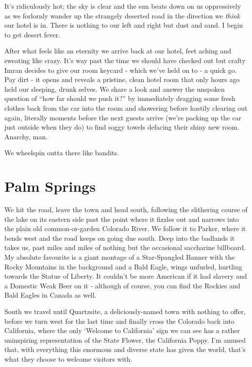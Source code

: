 \documentclass[a5paper,titlepage,11pt]{book}
\begin{document}
It's ridiculously hot; the sky is clear and the sun beats down on us oppressively as we forlornly wander up the strangely deserted road in the direction we \emph{think} our hotel is in.  There is nothing to our left and right but dust and sand.  I begin to get desert fever.

After what feels like an eternity we arrive back at our hotel, feet aching and sweating like crazy.  It's way past the time we should have checked out but crafty Imran decides to give our room keycard - which we've held on to - a quick go.  Pay dirt - it opens and reveals a pristine, clean hotel room that only hours ago held our sleeping, drunk selves.  We share a look and answer the unspoken question of ``how far should we push it?'' by immediately dragging some fresh clothes back from the car into the room and showering before hastily clearing out again, literally moments before the next guests arrive (we're packing up the car just outside when they do) to find soggy towels defacing their shiny new room.  Anarchy, man.

We wheelspin outta there like bandits.

\section*{Palm Springs}
We hit the road, leave the town and head south, following the slithering course of the lake on its eastern side past the point where it fizzles out and narrows into the plain old common-or-garden Colorado River.  We follow it to Parker, where it bends west and the road keeps on going due south.  Deep into the badlands it takes us, past miles and miles of nothing but the occasional saccharine billboard.  My absolute favourite is a giant montage of a Star-Spangled Banner with the Rocky Mountains in the background and a Bald Eagle, wings unfurled, hurtling towards the Statue of Liberty.  It couldn't be more American if it had slavery and a Domestic Weak Beer on it - although of course, you can find the Rockies and Bald Eagles in Canada as well.

South we travel until Quartzsite, a deliciously-named town with nothing to offer, before we turn west for the last time and finally cross the Colorado back into California, where the only `Welcome to California' sign we can see has a rather uninspiring representation of the State Flower, the California Poppy.  I'm amused that, with everything this enormous and diverse state has given the world, that's what they choose to welcome visitors with.
\end{document}

